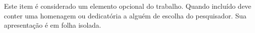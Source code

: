 \begin{dedicatoria}[DEDICATÓRIA]

Este item é considerado um elemento opcional do trabalho. Quando incluído deve
conter uma homenagem ou dedicatória a alguém de escolha do pesquisador. Sua apresentação
é em folha isolada.

\end{dedicatoria}
